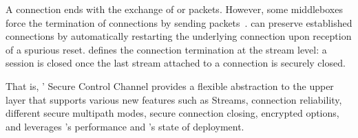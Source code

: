 A \tcp connection ends with the exchange of \fin or \rst packets. However, some
middleboxes force the termination of \tcp connections by sending \rst
packets~\cite{rfc3360,weaver2009detecting}. \tcpls can preserve established
connections by automatically restarting the underlying \tcp connection upon
reception of a spurious reset. \tcpls defines the connection termination at the
stream level: a \tcpls session is closed once the last stream attached to a \tcp
connection is securely closed.

That is, \tcpls' Secure Control Channel provides a flexible abstraction to the
upper layer that supports various new features such as Streams, connection
reliability, different secure multipath modes, secure connection closing,
encrypted \tcp options, and leverages \tcp's performance and \tls's state of
deployment.
